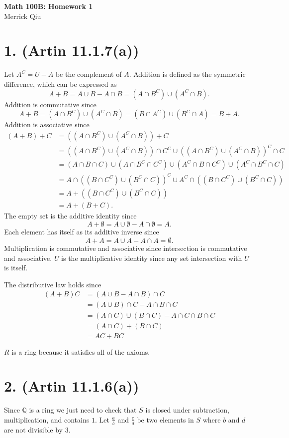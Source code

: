 \documentclass{article}
\begin{document}
\begin{center}
	\huge{\bf Math 100B: Homework 1} \\
	Merrick Qiu
\end{center}

\section*{1. (Artin 11.1.7(a))}
Let $A^C = U - A$ be the complement of $A$.
Addition is defined as the symmetric difference, which can be expressed as
\[
	A+B = A\cup B - A\cap B = (A\cap B^C) \cup (A^C\cap B).
\]
Addition is commutative since
\[
	A+B = (A\cap B^C) \cup (A^C\cap B) = (B\cap A^C) \cup(B^C\cap A) = B+A.
\]
Addition is associative since
\begin{align*}
	(A + B) + C &= ((A\cap B^C) \cup (A^C\cap B)) + C \\
	&= ((A\cap B^C) \cup (A^C\cap B)) \cap C^C \cup 
	((A\cap B^C) \cup (A^C\cap B))^C \cap C \\
	&= (A\cap B\cap C) \cup (A\cap B^C\cap C^C) \cup (A^C\cap B\cap C^C) \cup 
        (A^C\cap B^C \cap C) \\
	&= A\cap ((B\cap C^C) \cup (B^C\cap C))^C \cup A^C\cap ((B\cap C^C) \cup (B^C\cap C))\\
	&= A + ((B\cap C^C) \cup (B^C\cap C)) \\ 
	&= A+(B+C).
\end{align*}
The empty set is the additive identity since 
\[
	A + \emptyset = A\cup \emptyset - A\cap \emptyset = A.
\]
Each element has itself as its additive inverse since 
\[
	A + A = A\cup A - A\cap A = \emptyset.
\]
Multiplication is commutative and associative since 
intersection is commutative and associative.
$U$ is the multiplicative identity since any set intersection
with $U$ is itself.

The distributive law holds since 
\begin{align*}
	(A+B)C &= (A\cup B - A\cap B) \cap C \\
	&= (A\cup B)\cap C - A\cap B\cap C \\
	&= (A\cap C)\cup (B\cap C) - A\cap C\cap B\cap C \\
	&= (A\cap C) + (B\cap C) \\
	&= AC + BC 
\end{align*}

$R$ is a ring because it satisfies all of the axioms.
\newpage

\section*{2. (Artin 11.1.6(a))}
Since $\mathbb{Q}$ is a ring we
just need to check that $S$ is closed
under subtraction, multiplication, and contains $1$.
Let $\frac{a}{b}$ and $\frac{c}{d}$ be two elements in $S$
where $b$ and $d$ are not divisible by $3$.
\end{document}
